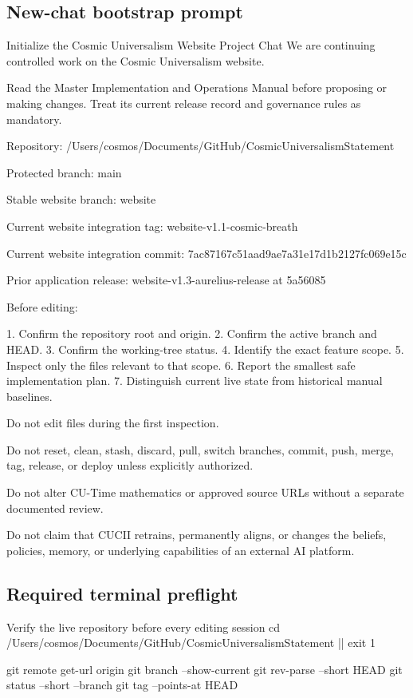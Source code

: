 \documentclass[11pt,letterpaper]{article}
\begin{document}
\subsection*{New-chat bootstrap prompt}

\begin{promptbox}{Initialize the Cosmic Universalism Website Project Chat}
We are continuing controlled work on the Cosmic Universalism website.

Read the Master Implementation and Operations Manual before proposing
or making changes. Treat its current release record and governance
rules as mandatory.

Repository:
/Users/cosmos/Documents/GitHub/CosmicUniversalismStatement

Protected branch:
main

Stable website branch:
website

Current website integration tag:
website-v1.1-cosmic-breath

Current website integration commit:
7ac87167c51aad9ae7a31e17d1b2127fc069e15c

Prior application release:
website-v1.3-aurelius-release at 5a56085

Before editing:

1. Confirm the repository root and origin.
2. Confirm the active branch and HEAD.
3. Confirm the working-tree status.
4. Identify the exact feature scope.
5. Inspect only the files relevant to that scope.
6. Report the smallest safe implementation plan.
7. Distinguish current live state from historical manual baselines.

Do not edit files during the first inspection.

Do not reset, clean, stash, discard, pull, switch branches, commit,
push, merge, tag, release, or deploy unless explicitly authorized.

Do not alter CU-Time mathematics or approved source URLs without a
separate documented review.

Do not claim that CUCII retrains, permanently aligns, or changes the
beliefs, policies, memory, or underlying capabilities of an external
AI platform.
\end{promptbox}

\subsection*{Required terminal preflight}

\begin{commandbox}{Verify the live repository before every editing session}
cd /Users/cosmos/Documents/GitHub/CosmicUniversalismStatement || exit 1

git remote get-url origin
git branch --show-current
git rev-parse --short HEAD
git status --short --branch
git tag --points-at HEAD
\end{commandbox}
\end{document}
